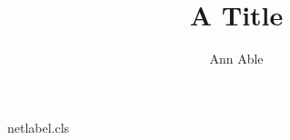 \begin{filecontents*}[overwrite]{netlabel.cls}
\def\@anames{}\def\@xa{}\def\@xb{}\def\@xc{}\def\@xd{}
\renewcommand\author[1]{\gdef\@anames{#1}}
\newcommand\xa[1]{\gdef\@xa{\ignorespaces#1}}
\newcommand\xb[1]{\gdef\@xb{\ignorespaces#1}}
\newcommand\xc[1]{\gdef\@xc{\ignorespaces#1}}
\newcommand\xd[1]{\gdef\@xd{\ignorespaces#1}}
\renewcommand\@author{\@anames\\\@xa\\\@xb\\\@xc\\\@xd}
\end{filecontents*}
\documentclass{netlabel}

\title{A Title}
\author{Ann Able}
\maketitle
Text.

